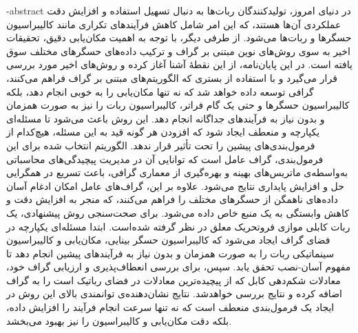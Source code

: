 \fa-abstract{
در دنیای امروز، تولیدکنندگان ربات‌ها به دنبال تسهیل استفاده و افزایش دقت عملکردی آن‌ها هستند، که این امر شامل کاهش فرآیندهای تکراری مانند کالیبراسیون حسگرها و ربات‌ها می‌شود. از طرفی دیگر، با توجه به اهمیت مکان‌یابی دقیق، تحقیقات اخیر به سوی روش‌های نوین مبتنی بر گراف و ترکیب داده‌های حسگرهای مختلف سوق یافته است.
در این پایان‌نامه، از این نقطهٔ آشنا آغاز کرده و روش‌های اخیر مورد بررسی قرار می‌گیرد و با استفاده از بستری که الگوریتم‌های مبتنی بر گراف فراهم می‌کنند، گرافی توسعه داده خواهد شد که نه تنها مکان‌یابی را به خوبی انجام دهد، بلکه کالیبراسیون حسگرها و حتی یک گام فراتر، کالیبراسیون ربات را نیز به صورت همزمان و بدون نیاز به فرآیندهای جداگانه انجام دهد. این روش باعث می‌شود تا مسئله‌ای یکپارچه و منعطف ایجاد شود که افزودن هر گونه قید به این مسئله، هیچ‌کدام از فرمول‌بندی‌های پیشین را تحت تأثیر قرار ندهد.
الگوریتم انتخاب شده برای این فرمول‌بندی، گراف عامل است که توانایی آن در مدیریت پیچیدگی‌های محاسباتی به‌واسطه‌ی ماتریس‌های بهینه و بهره‌گیری از معماری گرافی، باعث تسریع در همگرایی حل و افزایش پایداری نتایج می‌شود. علاوه بر این، گراف‌های عامل امکان ادغام آسان داده‌های ناهمگن از حسگرهای مختلف را فراهم می‌کنند، که منجر به افزایش دقت و کاهش وابستگی به یک منبع خاص داده می‌شود.
برای صحت‌سنجی روش پیشنهادی، یک ربات کابلی موازی فروتحریک معلق در نظر گرفته‌ شده‌است. ابتدا مسئله‌ای یکپارچه در فضای گراف ایجاد می‌شود که کالیبراسیون حسگر بینایی، مکان‌یابی و کالیبراسیون سینماتیکی ربات را به صورت همزمان و بدون نیاز به فرآیندهای پیشین انجام دهد تا مفهوم آسان-نصب تحقق یابد. سپس، برای بررسی انعطاف‌پذیری و ارزیابی گراف خود، معادلات شکم‌دهی کابل که از پیچیده‌ترین معادلات در فضای رباتیک است را به گراف اضافه کرده و نتایج بررسی خواهدشد. نتایج نشان‌دهنده‌ی توانمندی بالای این روش در ایجاد یک فرمول‌بندی منعطف است که نه تنها سرعت انجام فرآیند را افزایش داده، بلکه دقت مکان‌یابی و کالیبراسیون را نیز بهبود می‌بخشد.
}
